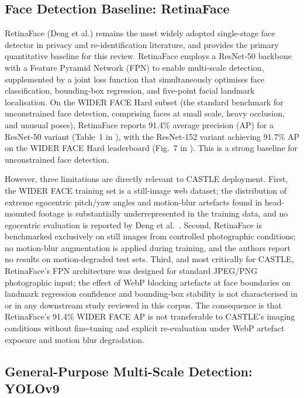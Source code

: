\documentclass[12pt, onecolumn]{IEEEtran}
\begin{document}
\subsection{Face Detection Baseline: RetinaFace}

RetinaFace \cite{deng2020retinaface} (Deng et al.) remains the most widely adopted single-stage face detector in privacy and
re-identification literature, and provides the primary quantitative baseline for this review. RetinaFace
employs a ResNet-50 backbone with a Feature Pyramid Network (FPN) to enable multi-scale detection,
supplemented by a joint loss function that simultaneously optimises face classification, bounding-box
regression, and five-point facial landmark localisation. On the WIDER FACE Hard subset (the
standard benchmark for unconstrained face detection, comprising faces at small scale, heavy occlusion, and
unusual poses), RetinaFace reports 91.4\% average precision (AP) for a ResNet-50 variant (Table~1 in \cite{deng2020retinaface}), with the ResNet-152 variant achieving 91.7\% AP on the WIDER FACE Hard leaderboard (Fig.~7 in \cite{deng2020retinaface}).
This is a strong baseline for unconstrained face detection.

However, three limitations are directly relevant to CASTLE deployment. First, the WIDER FACE training set is
a still-image web dataset; the distribution of extreme egocentric pitch/yaw angles and motion-blur artefacts
found in head-mounted footage is substantially underrepresented in the training data, and no egocentric
evaluation is reported by Deng et al.\ \cite{deng2020retinaface}. Second, RetinaFace is benchmarked exclusively on still images from
controlled photographic conditions; no motion-blur augmentation is applied during training, and the authors
report no results on motion-degraded test sets. Third, and most critically for CASTLE, RetinaFace's FPN
architecture was designed for standard JPEG/PNG photographic input; the effect of WebP blocking artefacts at
face boundaries on landmark regression confidence and bounding-box stability is not characterised in \cite{deng2020retinaface} or
in any downstream study reviewed in this corpus. The consequence is that RetinaFace's 91.4\% WIDER FACE AP
is not transferable to CASTLE's imaging conditions without fine-tuning and explicit re-evaluation under WebP
artefact exposure and motion blur degradation.

\subsection{General-Purpose Multi-Scale Detection: YOLOv9}
\end{document}
